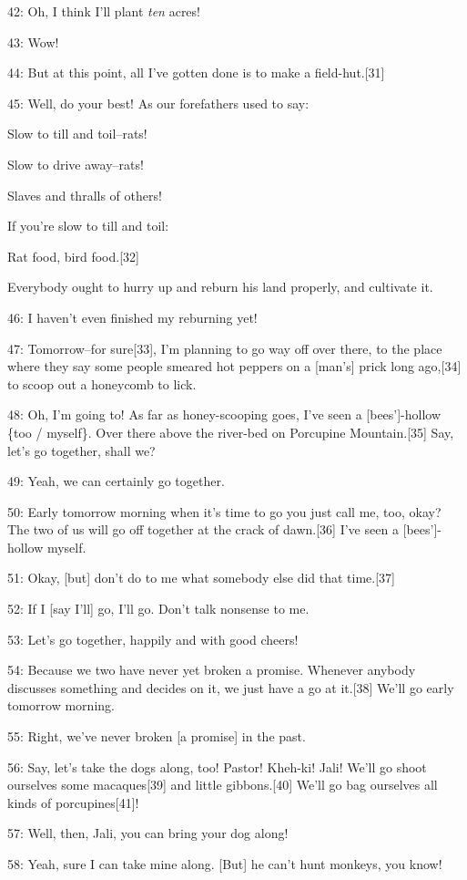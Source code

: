 42: Oh, I think I'll plant \textit{ten} acres!

43: Wow!

44: But at this point, all I've gotten done is to make a field-hut.[31]

45: Well, do your best! As our forefathers used to say:

Slow to till and toil--rats!

Slow to drive away--rats!

Slaves and thralls of others!

If you're slow to till and toil:

Rat food, bird food.[32]

Everybody ought to hurry up and reburn his land properly, and cultivate it.

46: I haven't even finished my reburning yet!

47: Tomorrow--for sure[33], I'm planning to go way off over there, to the place
where they say some people smeared hot peppers on a [man's] prick long ago,[34]
to scoop out a honeycomb to lick.

48: Oh, I'm going to! As far as honey-scooping goes, I've seen a [bees']-hollow
\{too / myself\}. Over there above the river-bed on Porcupine Mountain.[35] Say,
let's go together, shall we?

49: Yeah, we can certainly go together.

50: Early tomorrow morning when it's time to go you just call me, too, okay? The
two of us will go off together at the crack of dawn.[36] I've seen a [bees']-hollow
myself.

51: Okay, [but] don't do to me what somebody else did that time.[37]

52: If I [say I'll] go, I'll go. Don't talk nonsense to me.

53: Let's go together, happily and with good cheers!

54: Because we two have never yet broken a promise. Whenever anybody discusses
something and decides on it, we just have a go at it.[38] We'll go early tomorrow
morning.

55: Right, we've never broken [a promise] in the past.

56: Say, let's take the dogs along, too! Pastor! Kheh-ki! Jali! We'll go shoot
ourselves some macaques[39] and little gibbons.[40] We'll go bag ourselves all
kinds of porcupines[41]!

57: Well, then, Jali, you can bring your dog along!

58: Yeah, sure I can take mine along. [But] he can't hunt monkeys, you know!

